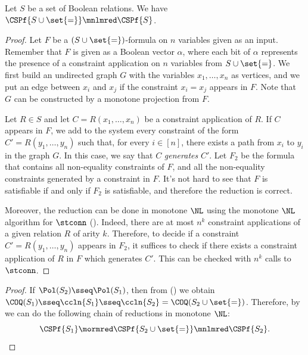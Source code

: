 \documentclass[11pt]{article}
\begin{document}
\begin{lemma}
    \label{prop:eql}
    Let $S$ be a set of Boolean relations.
    We have
    $\CSPf{S \cup \set{=}} \mnlmred \CSPf{S}$.
\end{lemma}
\begin{proof}
    Let $F$ be a $(S \cup \set{=})$-formula on $n$ variables
    given as an input.
    Remember that $F$ is given as a Boolean vector $\alpha$,
    where each bit of $\alpha$
    represents
    the presence of a constraint application on $n$ variables
    from $S \cup \set{=}$.
    We first build an undirected graph $G$ with the variables
    $x_1,\dots,x_n$ as vertices,
    and we put an edge between $x_i$ and $x_j$
    if the constraint $x_i = x_j$ appears in $F$.
    Note that $G$ can be constructed by a monotone projection from
    $F$.

    Let $R \in S$ and let
    $C = R(x_1,\dots,x_n)$ be a constraint application of $R$.
    If $C$ appears in $F$,
    we add to the system every constraint of the form
    $C' = R(y_1,\dots,y_n)$
    such that,
    for every $i \in [n]$,
    there exists a path from $x_i$ to $y_i$ in the graph $G$.
    In this case, we say that $C$ \emph{generates} $C'$.
    Let $F_2$ be the formula that contains all
    non-equality constraints of $F$,
    and all the non-equality constraints
    generated by a constraint in $F$.
    It's not hard to see that 
    $F$ is satisfiable if and only if $F_2$ is satisfiable,
    and therefore the reduction is correct.

    Moreover, the reduction can be done in monotone $\NL$
    using the monotone $\NL$ algorithm for $\stconn$
    ().
    Indeed, there are at most $n^k$ constraint applications of a given
    relation $R$ of arity $k$. Therefore,
    to decide if a constraint $C' = R(y_1,\dots,y_n)$ appears in $F_2$,
    it suffices to check if there exists a constraint application 
    of $R$ in $F$ which generates $C'$.
    This can be checked with $n^k$ calls to $\stconn$.
\end{proof}

\polym*
\begin{proof}
    If $\Pol(S_2) \sseq \Pol(S_1)$, then 
    from 
    ()
    we obtain
    $\COQ(S_1) \sseq \ccln{S_1} \sseq \ccln{S_2} = \COQ(S_2 \cup \set{=})$.
    Therefore, by~ 
    we can do the following chain of reductions in monotone $\NL$:
    \begin{equation*}
        \CSPf{S_1}
        \mormred
        \CSPf{S_2 \cup \set{=}}
        \mnlmred
        \CSPf{S_2}.
        \qedhere
    \end{equation*}
\end{proof}
\end{document}
